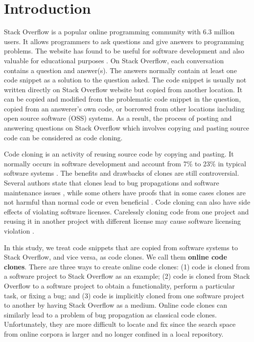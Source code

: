 \documentclass{sig-alternate-05-2015}
\begin{document}
\section{Introduction}
Stack Overflow is a popular online programming community with 6.3 million users. It allows programmers to ask questions and give answers to programming problems. The website has found to be useful for software development and also valuable for educational purposes \cite{x}. On Stack Overflow, each conversation contains a question and answer(s).  The answers normally contain at least one code snippet as a solution to the question asked. The code snippet is usually not written directly on Stack Overflow website but copied from another location. It can be copied and modified from the problematic code snippet in the question, copied from an answerer's own code, or borrowed from other locations including open source software (OSS) systems. As a result, the process of posting and answering questions on Stack Overflow which involves copying and pasting source code can be considered as code cloning. 

Code cloning is an activity of reusing source code by copying and pasting. It normally occurs in software development and account from 7\% to 23\% in typical software systems \cite{Bellon2007}. The benefits and drawbacks of clones are still controversial. Several authors state that clones lead to bug propagations and software maintenance issues \cite{Kamiya2002}, while some others have proofs that in some cases clones are not harmful than normal code or even beneficial \cite{Saini2016,Kapser2006}. Code cloning can also have side effects of violating software licenses. Carelessly cloning code from one project and reusing it in another project with different license may cause software licensing violation \cite{German2009}.

In this study, we treat code snippets that are copied from software systems to Stack Overflow, and vice versa, as code clones. We call them \textbf{online code clones}. There are three ways to create online code clones: (1) code is cloned from a software project to Stack Overflow as an example; (2) code is cloned from Stack Overflow to a software project to obtain a functionality, perform a particular task, or fixing a bug; and (3) code is implicitly cloned from one software project to another by having Stack Overflow as a medium. Online code clones can similarly lead to a problem of bug propagation as classical code clones. Unfortunately, they are more difficult to locate and fix since the search space from online corpora is larger and no longer confined in a local repository.
\end{document}
